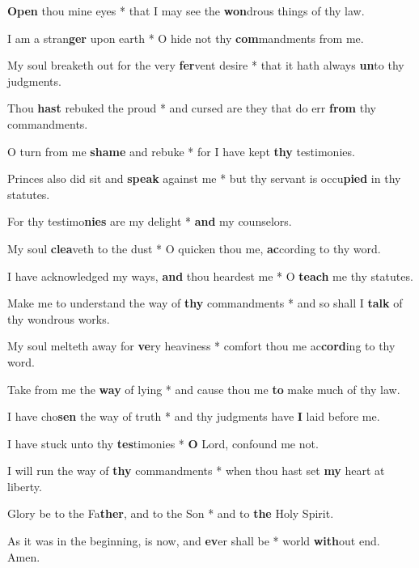 \begin{multicols}{2}
	\textbf{Open} thou mine eyes * that I may see the \textbf{won}drous things of thy law.
	
	I am a stran\textbf{ger} upon earth * O hide not thy \textbf{com}mandments from me.
	
	My soul breaketh out for the very \textbf{fer}vent desire * that it hath always \textbf{un}to thy judgments.
	
	Thou \textbf{hast} rebuked the proud * and cursed are they that do err \textbf{from} thy commandments.
	
	O turn from me \textbf{shame} and rebuke * for I have kept \textbf{thy} testimonies.
	
	Princes also did sit and \textbf{speak} against me * but thy servant is occu\textbf{pied} in thy statutes.
	
	For thy testimo\textbf{nies} are my delight * \textbf{and} my counselors.
	
	My soul \textbf{clea}veth to the dust * O quicken thou me, \textbf{ac}cording to thy word.
	
	I have acknowledged my ways, \textbf{and} thou heardest me * O \textbf{teach} me thy statutes.
	
	Make me to understand the way of \textbf{thy} commandments * and so shall I \textbf{talk} of thy wondrous works.
	
	My soul melteth away for \textbf{ve}ry heaviness * comfort thou me ac\textbf{cord}ing to thy word.
	
	Take from me the \textbf{way} of lying * and cause thou me \textbf{to} make much of thy law.
	
	I have cho\textbf{sen} the way of truth * and thy judgments have \textbf{I} laid before me.
	
	I have stuck unto thy \textbf{tes}timonies * \textbf{O} Lord, confound me not.
	
	I will run the way of \textbf{thy} commandments * when thou hast set \textbf{my} heart at liberty.
	
	Glory be to the Fa\textbf{ther}, and to the Son * and to \textbf{the} Holy Spirit.
	
	As it was in the beginning, is now, and \textbf{ev}er shall be * world \textbf{with}out end. Amen.
\end{multicols}